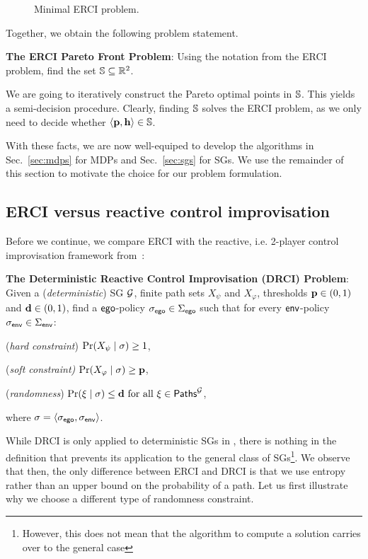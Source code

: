 {{{{\begin{figure}
\caption{Minimal ERCI problem.}
\end{figure}


Together, we obtain the following problem statement.
\begin{mdframed}[backgroundcolor=white!5]
\textbf{The ERCI Pareto Front Problem}:
Using the notation from the ERCI problem, find the set $\mathbb{S} \subseteq \mathbb{R}^2$.
\end{mdframed}
We are going to iteratively construct the  Pareto optimal points in $\mathbb{S}$. This yields a semi-decision procedure.
Clearly, finding $\mathbb{S}$ solves the ERCI problem, as we only need to decide whether $\langle \mathbf{p}, \mathbf{h} \rangle \in \mathbb{S}$.

With these facts, we are now well-equiped to develop the algorithms in Sec.~\ref{sec:mdps} for MDPs and Sec.~\ref{sec:sgs} for SGs.
We use the remainder of this section to motivate the choice for our problem formulation.

\subsection{ERCI versus reactive control improvisation}

Before we continue, we compare ERCI with the reactive, i.e. 2-player control improvisation framework from~\cite{}:
\begin{mdframed}
\textbf{The Deterministic Reactive Control Improvisation (DRCI) Problem}:
Given a (\emph{deterministic}) SG $\mathcal{G}$, finite path sets $X_\psi$ and $X_\varphi$,  thresholds $\mathbf{p} \in (0,1)$ and $\mathbf{d} \in (0,1)$,  find a $\mathsf{ego}$-policy ${\sigma_{\mathsf{ego}}} \in \Sigma_{\mathsf{ego}}$  such that for every $\mathsf{env}$-policy ${\sigma_{\mathsf{env}}} \in \Sigma_{\mathsf{env}}$: 
\begin{compactenum}
\item (\emph{hard constraint}) $\Pr(X_\psi \mid \sigma) \geq 1$,
	\item (\emph{soft constraint)} $\Pr(X_\varphi \mid \sigma) \geq \mathbf{p}$,
	\item (\emph{randomness}) $\Pr(\xi \mid \sigma) \leq \mathbf{d} \text{ for all } \xi \in \mathsf{Paths}^{\mathcal{G}}_{}$,
\end{compactenum}
where  $\sigma = \langle {\sigma_{\mathsf{ego}}}, {\sigma_{\mathsf{env}}} \rangle$.
\end{mdframed}
While DRCI is only applied to deterministic SGs in \cite{DBLP:conf/cav/FremontS18}, there is nothing in the definition that prevents its application to the general class of SGs\footnote{However, this does not mean that the algorithm to compute a solution carries over to the general case}.
We observe that then, the only difference between ERCI and DRCI is that we use entropy rather than an upper bound on the probability of a path.  Let us first illustrate why we choose a different type of randomness constraint.
\begin{figure}
\end{figure}}}}}

